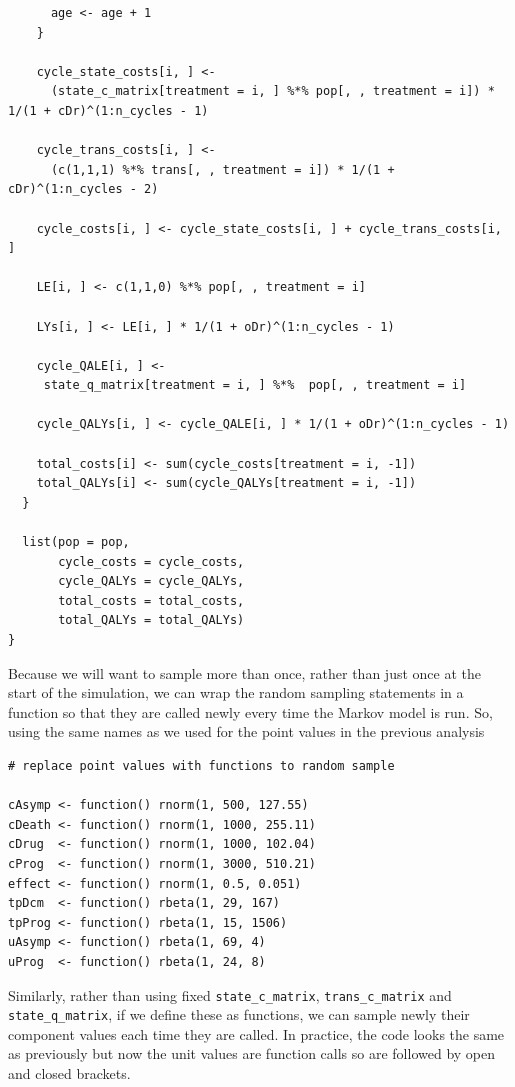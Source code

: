 \documentclass[a4paper,twoside,openany]{../svmonoBUGS}\usepackage[]{graphicx}\usepackage[]{color}
\begin{document}
\begin{verbatim}
      age <- age + 1
    }
    
    cycle_state_costs[i, ] <-
      (state_c_matrix[treatment = i, ] %*% pop[, , treatment = i]) * 1/(1 + cDr)^(1:n_cycles - 1)
    
    cycle_trans_costs[i, ] <-
      (c(1,1,1) %*% trans[, , treatment = i]) * 1/(1 + cDr)^(1:n_cycles - 2)
    
    cycle_costs[i, ] <- cycle_state_costs[i, ] + cycle_trans_costs[i, ]
    
    LE[i, ] <- c(1,1,0) %*% pop[, , treatment = i]
    
    LYs[i, ] <- LE[i, ] * 1/(1 + oDr)^(1:n_cycles - 1)
    
    cycle_QALE[i, ] <-
     state_q_matrix[treatment = i, ] %*%  pop[, , treatment = i]
    
    cycle_QALYs[i, ] <- cycle_QALE[i, ] * 1/(1 + oDr)^(1:n_cycles - 1)
    
    total_costs[i] <- sum(cycle_costs[treatment = i, -1])
    total_QALYs[i] <- sum(cycle_QALYs[treatment = i, -1])
  }
  
  list(pop = pop,
       cycle_costs = cycle_costs,
       cycle_QALYs = cycle_QALYs,
       total_costs = total_costs,
       total_QALYs = total_QALYs)
}
\end{verbatim}

Because we will want to sample more than once, rather than just once at the start of the simulation, we can wrap the random sampling statements in a function so that they are called newly every time the Markov model is run. So, using the same names as we used for the point values in the previous analysis

\begin{verbatim}
# replace point values with functions to random sample

cAsymp <- function() rnorm(1, 500, 127.55)
cDeath <- function() rnorm(1, 1000, 255.11)
cDrug  <- function() rnorm(1, 1000, 102.04)
cProg  <- function() rnorm(1, 3000, 510.21)
effect <- function() rnorm(1, 0.5, 0.051)
tpDcm  <- function() rbeta(1, 29, 167)
tpProg <- function() rbeta(1, 15, 1506)
uAsymp <- function() rbeta(1, 69, 4)
uProg  <- function() rbeta(1, 24, 8)
\end{verbatim}

Similarly, rather than using fixed \texttt{state\_c\_matrix}, \texttt{trans\_c\_matrix} and \texttt{state\_q\_matrix}, if we define these as functions, we can sample newly their component values each time they are called. In practice, the code looks the same as previously but now the unit values are function calls so are followed by open and closed brackets. 
\end{document}
